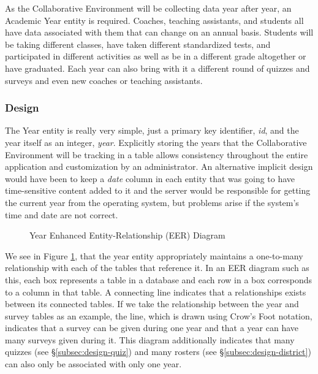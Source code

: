 As the Collaborative Environment will be collecting data year after year, an Academic Year entity is required. Coaches, teaching assistants, and students all have data associated with them that can change on an annual basis. Students will be taking different classes, have taken different standardized tests, and participated in different activities as well as be in a different grade altogether or have graduated. Each year can also bring with it a different round of quizzes and surveys and even new coaches or teaching assistants.


\subsubsection{Design}
The Year entity is really very simple, just a primary key identifier, \emph{id}, and the year itself as an integer, \emph{year}. Explicitly storing the years that the Collaborative Environment will be tracking in a table allows consistency throughout the entire application and customization by an administrator. An alternative implicit design would have been to keep a \emph{date} column in each entity that was going to have time-sensitive content added to it and the server would be responsible for getting the current year from the operating system, but problems arise if the system's time and date are not correct. 

\begin{figure}[h!]
	\centering
	\caption{Year Enhanced Entity-Relationship (EER) Diagram}
	\label{fig:er-year}
\end{figure}

We see in Figure \ref{fig:er-year}, that the year entity appropriately maintains a one-to-many relationship with each of the tables that reference it. In an EER diagram such as this, each box represents a table in a database and each row in a box corresponds to a column in that table. A connecting line indicates that a relationships exists between its connected tables. If we take the relationship between the year and survey tables as an example, the line, which is drawn using Crow's Foot notation, indicates that a survey can be given during one year and that a year can have many surveys given during it. This diagram additionally indicates that many quizzes (see \S \ref{subsec:design-quiz}) and many rosters (see \S \ref{subsec:design-district}) can also only be associated with only one year.

